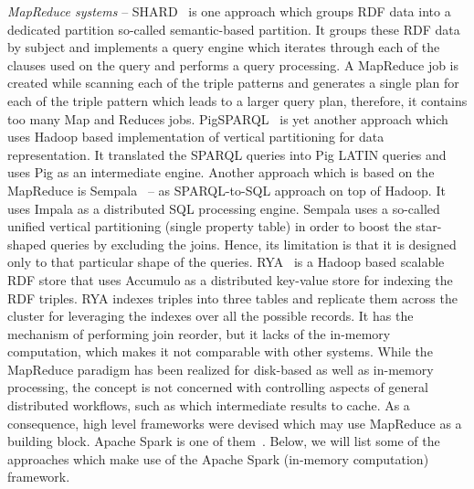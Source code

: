 \textit{MapReduce systems} -- SHARD~\cite{Rohloff2010} is one approach which groups RDF data into a dedicated partition so-called semantic-based partition.
It groups these RDF data by subject and implements a query engine which iterates through each of the clauses used on the query and performs a query processing.
A MapReduce job is created while scanning each of the triple patterns and generates a single plan for each of the triple pattern which leads to a larger query plan, therefore, it contains too many Map and Reduces jobs.
PigSPARQL~\cite{Schatzle2011PMS} is yet another approach which uses Hadoop based implementation of vertical partitioning for data representation.
It translated the SPARQL queries into Pig LATIN queries and uses Pig as an intermediate engine.
Another approach which is based on the MapReduce is Sempala~\cite{Schatzle2014Sempala} -- as SPARQL-to-SQL approach on top of Hadoop.
It uses Impala as a distributed SQL processing engine.
Sempala uses a so-called unified vertical partitioning (single property table) in order to boost the star-shaped queries by excluding the joins.
Hence, its limitation is that it is designed only to that particular shape of the queries.
RYA~\cite{Punnoose2012Rya} is a Hadoop based scalable RDF store that uses Accumulo as a distributed key-value store for indexing the RDF triples.
RYA indexes triples into three tables and replicate them across the cluster for leveraging the indexes over all the possible records.
It has the mechanism of performing join reorder, but it lacks of the in-memory computation, which makes it not comparable with other systems.
While the MapReduce paradigm has been realized for disk-based as well as in-memory processing, the concept is not concerned with controlling aspects of general distributed workflows, such as which intermediate results to cache. As a consequence, high level frameworks were devised which may use MapReduce as a building block.%
Apache Spark is one of them~\cite{zaharia2012resilient}.
Below, we will list some of the approaches which make use of the Apache Spark (in-memory computation) framework.

